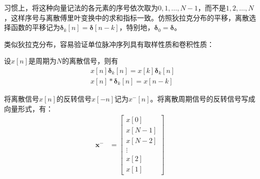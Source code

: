 习惯上，将这种向量记法的各元素的序号依次取为$0,1,\dots,N-1$，而不是$1,2,\dots,N$，这样序号与离散傅里叶变换中的求和指标一致。仿照狄拉克分布的平移，离散选择函数的平移记为$\boldsymbol{\delta}_k[n]=\boldsymbol{\delta}[n-k]$，特别地，$\boldsymbol{\delta}_0=\boldsymbol{\delta}$。

类似狄拉克分布，容易验证单位脉冲序列具有取样性质和卷积性质：
\begin{proposition}
    设$x[n]$是周期为$N$的离散信号，则有
    \begin{align*}
        &x[n]\boldsymbol{\delta}_k[n]=x[k]\boldsymbol{\delta}_k[n]\\
        &x[n]*\boldsymbol{\delta}_k[n]=x[n-k]
    \end{align*}
\end{proposition}

\begin{definition}[离散信号的反转]
    将离散信号$x[n]$的反转信号$x[-n]$记为$x^-[n]$。将离散周期信号的反转信号写成向量形式，有：
    \begin{align*}
    \textbf{x}^-&=\begin{bmatrix}
x[0]  \\
x[N-1]  \\
x[N-2]\\
\vdots \\
x[2]\\
x[1]
\end{bmatrix}\end{align*}
\end{definition}


